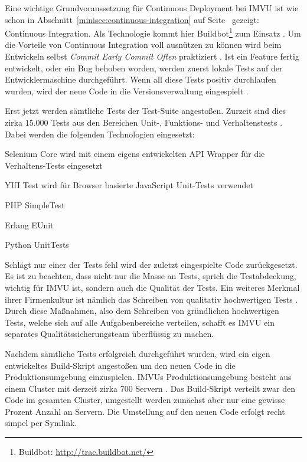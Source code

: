  Eine wichtige Grundvoraussetzung für Continuous Deployment
bei IMVU ist wie schon in Abschnitt~\ref{minisec:continuous-integration} auf
Seite~\pageref{minisec:continuous-integration} gezeigt: Continuous
Integration. Als Technologie kommt hier Buildbot\footnote{Buildbot:
\url{http://trac.buildbot.net/}} zum Einsatz \cite{imvu09}. Um die Vorteile
von Continuous Integration voll ausnützen zu können wird beim Entwickeln
selbst \emph{Commit Early Commit Often} praktiziert \cite{Fitz2009-02-10}. Ist
ein Feature fertig entwickelt, oder ein Bug behoben worden, werden zuerst
lokale Tests auf der Entwicklermaschine durchgeführt. Wenn all diese Tests
positiv durchlaufen wurden, wird der neue Code in die Versionsverwaltung
eingespielt \cite{imvu10}.

Erst jetzt werden sämtliche Tests der Test-Suite angestoßen. Zurzeit sind dies
zirka $15.000$ Tests aus den Bereichen Unit-, Funktions- und Verhaltenstests
\cite{imvu10}. Dabei werden die folgenden Technologien eingesetzt:

\begin{itemize*}
    \item Selenium Core wird mit einem eigens entwickelten API Wrapper für
          die Verhaltens-Tests eingesetzt
    \item YUI Test wird für Browser basierte JavaScript Unit-Tests verwendet
    \item PHP SimpleTest
    \item Erlang EUnit
    \item Python UnitTests
\end{itemize*}

Schlägt nur einer der Tests fehl wird der zuletzt eingespielte Code
zurückgesetzt. Es ist zu beachten, dass nicht nur die Masse an Tests, sprich
die Testabdeckung, wichtig für IMVU ist, sondern auch die Qualität der Tests.
Ein weiteres Merkmal ihrer Firmenkultur ist nämlich das Schreiben von
qualitativ hochwertigen Tests \cite{Fitz2009-02-10}. Durch diese Maßnahmen,
also dem Schreiben von gründlichen hochwertigen Tests, welche sich auf alle
Aufgabenbereiche verteilen, schafft es IMVU ein separates
Qualitätssicherungsteam überflüssig zu machen.

Nachdem sämtliche Tests erfolgreich durchgeführt wurden, wird ein eigen
entwickeltes Build-Skript angestoßen um den neuen Code in die
Produktionsumgebung einzuspielen. IMVUs Produktionsumgebung besteht aus einem
Cluster mit derzeit zirka 700 Servern \cite{imvu10}. Das Build-Skript verteilt
zwar den Code im gesamten Cluster, umgestellt werden zunächst aber nur eine
gewisse Prozent Anzahl an Servern. Die Umstellung auf den neuen Code erfolgt
recht simpel per Symlink.

